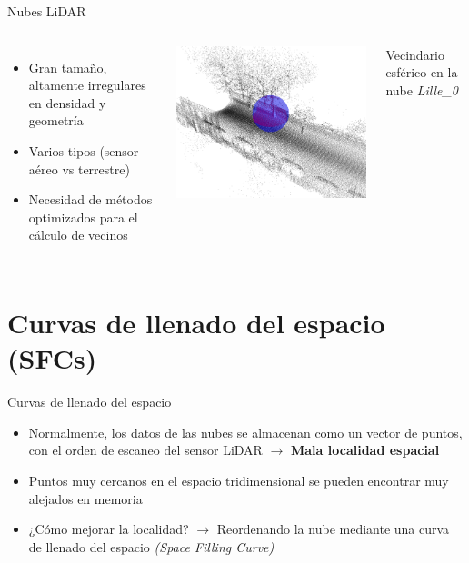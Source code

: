 \documentclass[aspectratio=169]{beamer}
\begin{document}
\begin{frame}{Nubes LiDAR}
    \begin{columns}
            \begin{itemize}
                \item Gran tamaño, altamente irregulares en densidad y geometría
                \item Varios tipos (sensor aéreo vs terrestre)
                \item Necesidad de métodos optimizados para el cálculo de vecinos
            \end{itemize}        
            \includegraphics[scale=0.65]{img/vecindario_lille.png}
            {\scriptsize \centering Vecindario esférico en la nube \textit{Lille\_0} \par}
        \end{columns}
\end{frame}

\section{Curvas de llenado del espacio (SFCs)}
\begin{frame}{Curvas de llenado del espacio}
    \begin{itemize}
        \item Normalmente, los datos de las nubes se almacenan como un vector de puntos, con el orden de escaneo del sensor LiDAR $\rightarrow$ \textbf{Mala localidad espacial} 
        \item Puntos muy cercanos en el espacio tridimensional se pueden encontrar muy alejados en memoria
        \item ¿Cómo mejorar la localidad? $\rightarrow$ Reordenando la nube mediante una curva de llenado del espacio \textit{(Space Filling Curve)} \cite{asano1997space}
    \end{itemize}
\end{frame}
\end{document}
